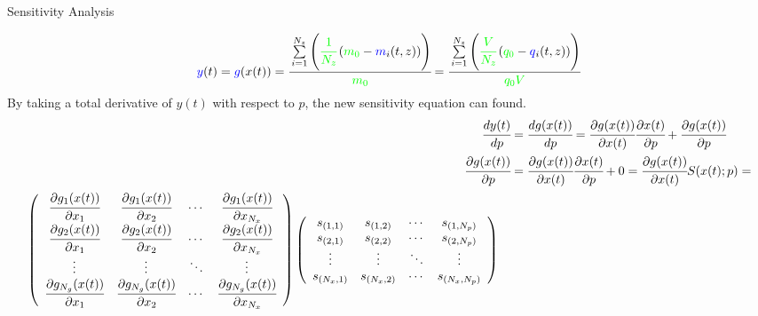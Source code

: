 \documentclass[8pt]{beamer}
\begin{document}
	\begin{frame}[fragile]{Sensitivity Analysis}

		\footnotesize{\begin{align*}
		\textcolor{blue}{y}(t) &= \textcolor{blue}{g}(x(t)) =\cfrac{\sum\limits_{i=1}^{N_z}  \left(  \textcolor{green}{\cfrac{1}{N_z}} \left(\textcolor{green}{m_0} - \textcolor{blue}{m}_i(t,z) \right) \right) }{\textcolor{green}{m_0}} =  \cfrac{\sum\limits_{i=1}^{N_z}  \left(  \textcolor{green}{\cfrac{V}{N_z}} \left(\textcolor{green}{q_0} - \textcolor{blue}{q}_i(t,z) \right) \right) }{\textcolor{green}{q_0 V}}\\ 
		\end{align*}}
		By taking a total derivative of $y(t)$ with respect to $p$, the new sensitivity equation can found.\\
		\footnotesize{\begin{align*}
		\cfrac{d y(t)}{dp} &= \cfrac{d g(x(t))}{dp} = \cfrac{\partial g(x(t))}{\partial x(t)} \cfrac{\partial x(t)}{\partial p} + \cfrac{\partial g(x(t))}{\partial p}\\
		\cfrac{\partial g(x(t))}{\partial p} &= \cfrac{\partial g(x(t))}{\partial x(t)} \cfrac{\partial x(t)}{\partial p} + 0 = \cfrac{\partial g(x(t))}{\partial x(t)}  S(x(t);p) = \\
		\begin{split}
				&\left(\begin{array}{cccc}
					\cfrac{\partial g_{1}(x(t))}{\partial x_{1}} & \cfrac{\partial g_{1}(x(t))}{\partial x_{2}} & \cdots & \cfrac{\partial g_{1}(x(t))}{\partial x_{N_x}}\\
					\cfrac{\partial g_{2}(x(t))}{\partial x_{1}} & \cfrac{\partial g_{2}(x(t))}{\partial x_{2}} & \cdots & \cfrac{\partial g_{2}(x(t))}{\partial x_{N_x}}\\
					\vdots & \vdots & \ddots & \vdots\\
					\cfrac{\partial g_{N_g}(x(t))}{\partial x_{1}} & \cfrac{\partial g_{N_g}(x(t))}{\partial x_{2}} & \cdots & \cfrac{\partial g_{N_g}(x(t))}{\partial x_{N_x}}
				\end{array}\right)
				\left(\begin{array}{cccc}
					s_{({1,1})} & s_{({1,2})} & \cdots & s_{({1,N_p})}\\
					s_{({2,1})} & s_{({2,2})} & \cdots & s_{({2,N_p})}\\
					\vdots & \vdots & \ddots & \vdots\\
					s_{({N_x,1})} & s_{({N_x,2})} & \cdots & s_{({N_x,N_p})}\\
				\end{array}\right)
		\end{split}
	\end{align*}}
	\end{frame}
	
\end{document}

